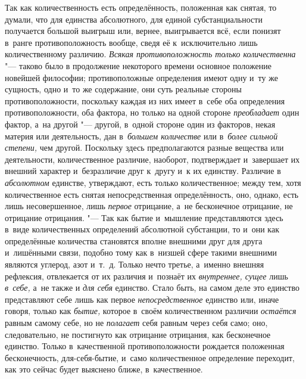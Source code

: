 \label{bkm:bm69a}Так как количественность есть определённость, положенная как
снятая, то думали, что для единства абсолютного, для единой субстанциальности
получается большой выигрыш или, вернее, выигрывается всё, если понизят в~ранге
противоположность вообще, сведя её к~исключительно лишь количественному
различию. {\em Всякая противоположность только количественна} "--- таково было
в продолжение некоторого времени основное положение новейшей
философии; противоположные определения
имеют одну и~ту же сущность, одно и~то же содержание, они суть реальные стороны
противоположности, поскольку каждая из них имеет в~себе оба определения
противоположности, оба фактора, но только на одной стороне {\em преобладает}
один фактор, а~на другой "--- другой, в~одной стороне один из факторов, некая
материя или деятельность, дан в~{\em большем количестве} или
в~{\em более сильной степени,} чем другой. Поскольку здесь предполагаются
разные вещества или деятельности, количественное различие, наоборот,
подтверждает и~завершает их внешний характер и~безразличие друг к~другу и~к их
единству. Различие в {\em абсолютном} единстве, утверждают, есть только
количественное; между тем, хотя количественное есть снятая непосредственная
определённость, оно, однако, есть лишь несовершенное, лишь {\em первое}
отрицание, а~не бесконечное отрицание, не отрицание отрицания. "--- Так как
бытие и~мышление представляются здесь в~виде количественных определений
абсолютной субстанции, то и~они как определённые количества становятся вполне
внешними друг для друга и~лишёнными связи, подобно тому как в~низшей сфере
такими внешними являются углерод, азот и~т.~д. Только нечто третье, а~именно
внешняя рефлексия, отвлекается от их различия и~познаёт их
{\em внутреннее, сущее} лишь {\em в~себе,} а~не также и {\em для себя}
единство. Стало быть, на самом деле это единство представляют себе лишь как
первое {\em непосредственное} единство или, иначе говоря, только как
{\em бытие,} которое в~своём количественном различии {\em остаётся} равным
самому себе, но не {\em полагает} себя равным через себя само; оно,
следовательно, не постигнуто как отрицание отрицания, как бесконечное единство.
Только в~качественной противоположности рождается положенная бесконечность,
для-себя-бытие, и~само количественное определение переходит, как это сейчас
будет выяснено ближе, в~качественное.


